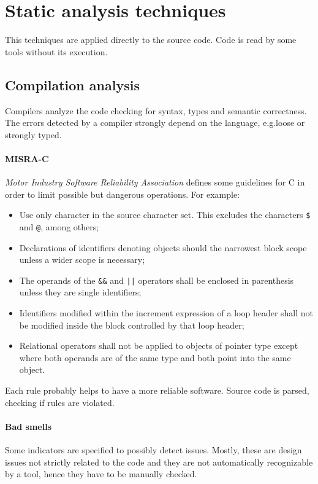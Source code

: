 \section{Static analysis techniques}
This techniques are applied directly to the source code. Code is read by some tools without its execution.

\subsection{Compilation analysis}
Compilers analyze the code checking for syntax, types and semantic correctness. The errors detected by a compiler strongly depend on the language, e.g.\@ loose or strongly typed.

\paragraph{MISRA-C}
\emph{Motor Industry Software Reliability Association} defines some guidelines for C in order to limit possible but dangerous operations. For example:
\begin{itemize}
\item Use only character in the source character set. This excludes the characters \texttt{\$} and \texttt{@}, among others;
\item Declarations of identifiers denoting objects should the narrowest block scope unless a wider scope is necessary;
\item The operands of the \texttt{\&\&} and \texttt{||} operators shall be enclosed in parenthesis unless they are single identifiers;
\item Identifiers modified within the increment expression of a loop header shall not be modified inside the block controlled by that loop header;
\item Relational operators shall not be applied to objects of pointer type except where both operands are of the same type and both point into the same object.
\end{itemize}
Each rule probably helps to have a more reliable software. Source code is parsed, checking if rules are violated.

\paragraph{Bad smells}
Some indicators are specified to possibly detect issues. Mostly, these are design issues not strictly related to the code and they are not automatically recognizable by a tool, hence they have to be manually checked.

